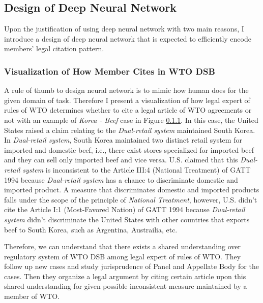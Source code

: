 \documentclass[12pt,letterpaper]{article}
\begin{document}
\subsection{Design of Deep Neural Network}
Upon the justification of using deep neural network with two main reasons, %
I introduce a design of deep neural network that is expected to efficiently encode members' legal citation pattern.

\subsubsection{Visualization of How Member Cites in WTO DSB}
A rule of thumb to design neural network is to mimic 
how human does for the given domain of task. 
Therefore I present a visualization of how legal expert of rules of WTO determines whether to cite a legal article of WTO agreements or not with an example of \textit{Korea - Beef} case in Figure \ref{}.
In this case, the United States raised a claim relating to the \textit{Dual-retail system} maintained South Korea. In \textit{Dual-retail system}, South Korea maintained two distinct retail system
for imported and domestic beef, i.e., there exist stores specialized for imported beef and they can sell only imported beef and vice versa. U.S. claimed that this \textit{Dual-retail system} is inconsistent to the Article III:4 (National Treatment) of GATT 1994 
because \textit{Dual-retail system} has a chance to discriminate domestic and imported product. A measure that discriminates domestic and imported products falls under the scope of the principle of \textit{National Treatment}, however, U.S. didn't 
cite the Article I:1 (Most-Favored Nation) of GATT 1994 
because \textit{Dual-retail system} didn't discriminate the United States with other countries that exports beef to South Korea, such as Argentina, Austrailia, etc.

Therefore, we can understand that there exists a shared understanding over regulatory system of WTO DSB among legal expert of rules of WTO. They follow up new cases and study jurisprudence of Panel and Appellate Body for the cases.
Then they organize a legal argument by citing certain article upon this shared understanding for given possible inconsistent measure maintained by a member of WTO.


\end{document}
